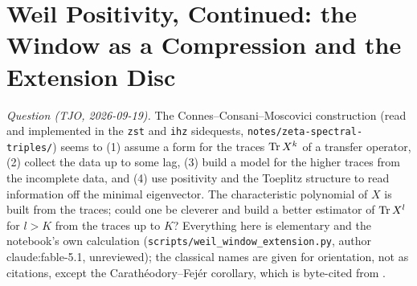 
\section{Weil Positivity, Continued: the Window as a Compression and the Extension Disc}
\label{sec:weil-window-extension}

\emph{Question (TJO, 2026-09-19).} The Connes--Consani--Moscovici construction
\cite{connes2025zeta} (read and implemented in the \texttt{zst} and \texttt{ihz} sidequests,
\texttt{notes/zeta-spectral-triples/}) seems to (1) assume a form for the traces $\operatorname{Tr} X^k$ of a
transfer operator, (2) collect the data up to some lag, (3) build a model for the higher traces
from the incomplete data, and (4) use positivity and the Toeplitz structure to read information
off the minimal eigenvector. The characteristic polynomial of $X$ is built from the traces; could
one be cleverer and build a better estimator of $\operatorname{Tr} X^l$ for $l > K$ from the traces up to $K$?
Everything here is elementary and the notebook's own calculation
(\texttt{scripts/weil\_window\_extension.py}, author claude:fable-5.1, unreviewed); the classical
names are given for orientation, not as citations, except the Carath\'eodory--Fej\'er corollary,
which is byte-cited from \cite{connes2025quadratic}.

